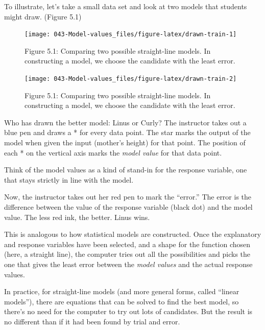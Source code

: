 \documentclass[]{tufte-book}
\begin{document}
To illustrate, let's take a small data set and look at two models that students might draw. (Figure 5.1)



\begin{figure}\texttt{[image: 043-Model-values\_files/figure-latex/drawn-train-1]} \caption[Figure 5.1: Comparing two possible straight-line models. In constructing a model, we choose the candidate with the least error.]{Figure 5.1: Comparing two possible straight-line models. In constructing a model, we choose the candidate with the least error.}\label{fig:drawn-train}
\end{figure}
\begin{figure}\texttt{[image: 043-Model-values\_files/figure-latex/drawn-train-2]} \caption[Figure 5.1: Comparing two possible straight-line models. In constructing a model, we choose the candidate with the least error.]{Figure 5.1: Comparing two possible straight-line models. In constructing a model, we choose the candidate with the least error.}\label{fig:drawn-train}
\end{figure}

Who has drawn the better model: Linus or Curly? The instructor takes out a blue pen and draws a * for every data point. The star marks the output of the model when given the input (mother's height) for that point. The position of each * on the vertical axis marks the \emph{model value} for that data point.

Think of the model values as a kind of stand-in for the response variable, one that stays strictly in line with the model.

Now, the instructor takes out her red pen to mark the ``error.'' The error is the difference between the value of the response variable (black dot) and the model value. The less red ink, the better. Linus wins.

This is analogous to how statistical models are constructed. Once the explanatory and response variables have been selected, and a shape for the function chosen (here, a straight line), the computer tries out all the possibilities and picks the one that gives the least error between the \emph{model values} and the actual response values.

In practice, for straight-line models (and more general forms, called ``linear models''), there are equations that can be solved to find the best model, so there's no need for the computer to try out lots of candidates. But the result is no different than if it had been found by trial and error.
\end{document}
